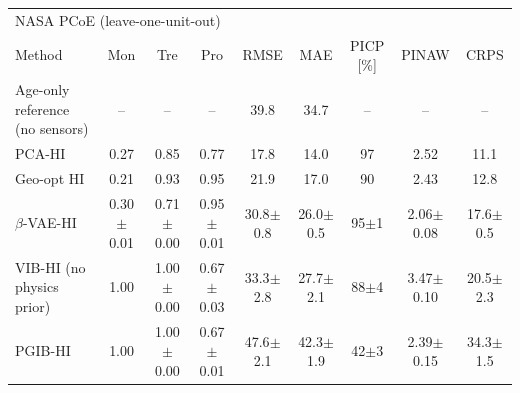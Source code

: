 \begin{tabular}{l c c c c c c c c}
\hline
\multicolumn{9}{l}{NASA PCoE (leave-one-unit-out)}\\
 Method & Mon & Tre & Pro & RMSE & MAE & PICP [\%] & PINAW & CRPS \\
\hline
Age-only reference (no sensors) & -- & -- & -- & 39.8 & 34.7 & -- & -- & -- \\
PCA-HI & 0.27 & 0.85 & 0.77 & 17.8 & 14.0 & 97 & 2.52 & 11.1 \\
Geo-opt HI & 0.21 & 0.93 & 0.95 & 21.9 & 17.0 & 90 & 2.43 & 12.8 \\
$\beta$-VAE-HI & 0.30$\pm$0.01 & 0.71$\pm$0.00 & 0.95$\pm$0.01 & 30.8$\pm$0.8 & 26.0$\pm$0.5 & 95$\pm$1 & 2.06$\pm$0.08 & 17.6$\pm$0.5 \\
VIB-HI (no physics prior) & 1.00 & 1.00$\pm$0.00 & 0.67$\pm$0.03 & 33.3$\pm$2.8 & 27.7$\pm$2.1 & 88$\pm$4 & 3.47$\pm$0.10 & 20.5$\pm$2.3 \\
PGIB-HI & 1.00 & 1.00$\pm$0.00 & 0.67$\pm$0.01 & 47.6$\pm$2.1 & 42.3$\pm$1.9 & 42$\pm$3 & 2.39$\pm$0.15 & 34.3$\pm$1.5 \\
\hline
\end{tabular}
